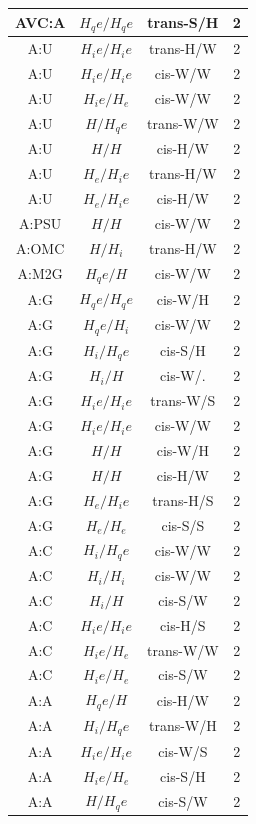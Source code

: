 \begin{center}
\begin{longtable}{c|c|c|c}
AVC:A & $H_qe/H_qe$ & trans-S/H & 2 \\  \hline
A:U & $H_ie/H_ie$ & trans-H/W & 2 \\  \hline
A:U & $H_ie/H_ie$ & cis-W/W & 2 \\  \hline
A:U & $H_ie/H_e$ & cis-W/W & 2 \\  \hline
A:U & $H/H_qe$ & trans-W/W & 2 \\  \hline
A:U & $H/H$ & cis-H/W & 2 \\  \hline
A:U & $H_e/H_ie$ & trans-H/W & 2 \\  \hline
A:U & $H_e/H_ie$ & cis-H/W & 2 \\  \hline
A:PSU & $H/H$ & cis-W/W & 2 \\  \hline
A:OMC & $H/H_i$ & trans-H/W & 2 \\  \hline
A:M2G & $H_qe/H$ & cis-W/W & 2 \\  \hline
A:G & $H_qe/H_qe$ & cis-W/H & 2 \\  \hline
A:G & $H_qe/H_i$ & cis-W/W & 2 \\  \hline
A:G & $H_i/H_qe$ & cis-S/H & 2 \\  \hline
A:G & $H_i/H$ & cis-W/. & 2 \\  \hline
A:G & $H_ie/H_ie$ & trans-W/S & 2 \\  \hline
A:G & $H_ie/H_ie$ & cis-W/W & 2 \\  \hline
A:G & $H/H$ & cis-W/H & 2 \\  \hline
A:G & $H/H$ & cis-H/W & 2 \\  \hline
A:G & $H_e/H_ie$ & trans-H/S & 2 \\  \hline
A:G & $H_e/H_e$ & cis-S/S & 2 \\  \hline
A:C & $H_i/H_qe$ & cis-W/W & 2 \\  \hline
A:C & $H_i/H_i$ & cis-W/W & 2 \\  \hline
A:C & $H_i/H$ & cis-S/W & 2 \\  \hline
A:C & $H_ie/H_ie$ & cis-H/S & 2 \\  \hline
A:C & $H_ie/H_e$ & trans-W/W & 2 \\  \hline
A:C & $H_ie/H_e$ & cis-S/W & 2 \\  \hline
A:A & $H_qe/H$ & cis-H/W & 2 \\  \hline
A:A & $H_i/H_qe$ & trans-W/H & 2 \\  \hline
A:A & $H_ie/H_ie$ & cis-W/S & 2 \\  \hline
A:A & $H_ie/H_e$ & cis-S/H & 2 \\  \hline
A:A & $H/H_qe$ & cis-S/W & 2 \\  \hline

\end{longtable}
\end{center}
